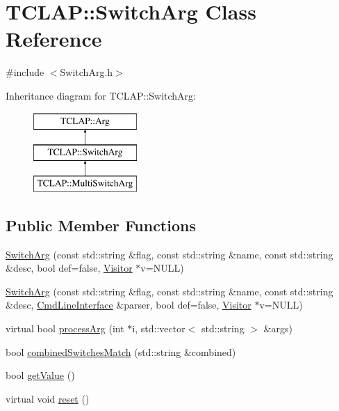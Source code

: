 \hypertarget{class_t_c_l_a_p_1_1_switch_arg}{}\section{T\+C\+L\+A\+P\+:\+:Switch\+Arg Class Reference}
\label{class_t_c_l_a_p_1_1_switch_arg}


{\ttfamily \#include $<$Switch\+Arg.\+h$>$}

Inheritance diagram for T\+C\+L\+A\+P\+:\+:Switch\+Arg\+:\begin{figure}[H]
\begin{center}
\leavevmode
\includegraphics[height=3.000000cm]{class_t_c_l_a_p_1_1_switch_arg}
\end{center}
\end{figure}
\subsection*{Public Member Functions}
\begin{DoxyCompactItemize}
\item 
\hyperlink{class_t_c_l_a_p_1_1_switch_arg_a3895b036fa2d36e4fcfa41dfcdb298c1}{Switch\+Arg} (const std\+::string \&flag, const std\+::string \&name, const std\+::string \&desc, bool def=false, \hyperlink{class_t_c_l_a_p_1_1_visitor}{Visitor} $\ast$v=N\+U\+L\+L)
\item 
\hyperlink{class_t_c_l_a_p_1_1_switch_arg_af7e9628155772af0686f6a2114dfe78b}{Switch\+Arg} (const std\+::string \&flag, const std\+::string \&name, const std\+::string \&desc, \hyperlink{class_t_c_l_a_p_1_1_cmd_line_interface}{Cmd\+Line\+Interface} \&parser, bool def=false, \hyperlink{class_t_c_l_a_p_1_1_visitor}{Visitor} $\ast$v=N\+U\+L\+L)
\item 
virtual bool \hyperlink{class_t_c_l_a_p_1_1_switch_arg_a624f98df6c4907efec95ffc353e9d08c}{process\+Arg} (int $\ast$i, std\+::vector$<$ std\+::string $>$ \&args)
\item 
bool \hyperlink{class_t_c_l_a_p_1_1_switch_arg_af5fbd44d462539941b09e960034d692c}{combined\+Switches\+Match} (std\+::string \&combined)
\item 
bool \hyperlink{class_t_c_l_a_p_1_1_switch_arg_aed1bc8a81a9bda4013cfcf407ccc7716}{get\+Value} ()
\item 
virtual void \hyperlink{class_t_c_l_a_p_1_1_switch_arg_af8561d903ec3c11f5f2175e6db179d9c}{reset} ()
\end{DoxyCompactItemize}
